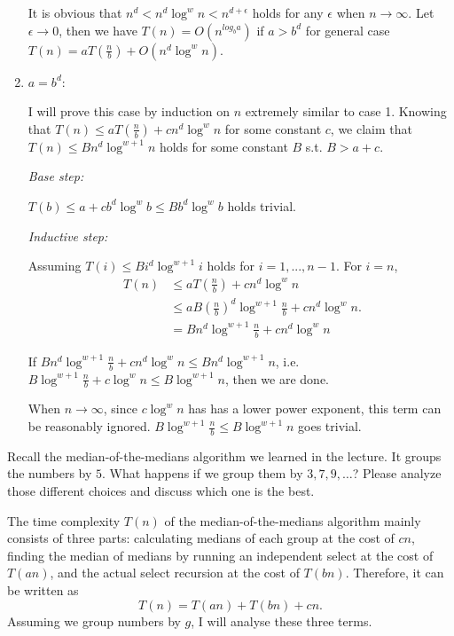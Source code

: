 \documentclass{oxmathproblems}
\begin{document}
\begin{questions}
\begin{Solution}
\begin{enumerate}
    It is obvious that $n^d < n^d\log^w n < n^{d+\epsilon}$ holds for any $\epsilon$ when $n\rightarrow \infty$. Let $\epsilon \rightarrow 0$, then we have $T(n)=O(n^{log_b a})$ if $a>b^d$ for general case $T(n) = a T(\frac{n}{b}) + O(n^d\log^w n)$.
    
    \item $a=b^d$: 

    I will prove this case by induction on $n$ extremely similar to case 1. Knowing that $T(n)\leq aT(\frac{n}{b})+cn^d \log^w n$ for some constant $c$, we claim that $T(n)\leq Bn^d \log^{w+1} n$ holds for some constant $B$ s.t. $B>a+c$.

    \emph{Base step:} 
    
    $T(b)\leq a+cb^d\log^w b\leq Bb^d\log^w b$ holds trivial.

    \emph{Inductive step:}
    
    Assuming $T(i)\leq Bi^d\log^{w+1} i$ holds for $i=1,...,n-1$.
    For $i=n$, \begin{align*}\
        T(n) &\leq aT(\frac{n}{b})+cn^d \log^w n \\
        &\leq aB(\frac{n}{b})^d\log^{w+1} \frac{n}{b}+cn^d\log^w n. \\
        &= Bn^d\log^{w+1} \frac{n}{b}+cn^d\log^w n
    \end{align*}

    If $Bn^d\log^{w+1} \frac{n}{b}+cn^d\log^w n \leq Bn^d \log^{w+1} n$, i.e. $B\log^{w+1} \frac{n}{b}+c\log^w n \leq B \log^{w+1} n$, then we are done.
    
    When $n\rightarrow \infty$, since $c\log^w n$ has has a lower power exponent, this term can be reasonably ignored. $B\log^{w+1} \frac{n}{b} \leq B \log^{w+1} n$ goes trivial.
    
\end{enumerate}

\end{Solution}

\miquestion[25]
Recall the median-of-the-medians algorithm we learned in the lecture. It groups the numbers by $5$. What happens if we group them by $3,7,9, \dots$? Please analyze those different choices and discuss which one is the best. 

\begin{Solution}

The time complexity $T(n)$ of the median-of-the-medians algorithm mainly consists of three parts: calculating medians of each group at the cost of $cn$, finding the median of medians by running an independent select at the cost of $T(an)$, and the actual select recursion at the cost of $T(bn)$. Therefore, it can be written as $$T(n)=T(an)+T(bn)+cn.$$ Assuming we group numbers by $g$, I will analyse these three terms.


\end{Solution}
\end{questions}
\end{document}
